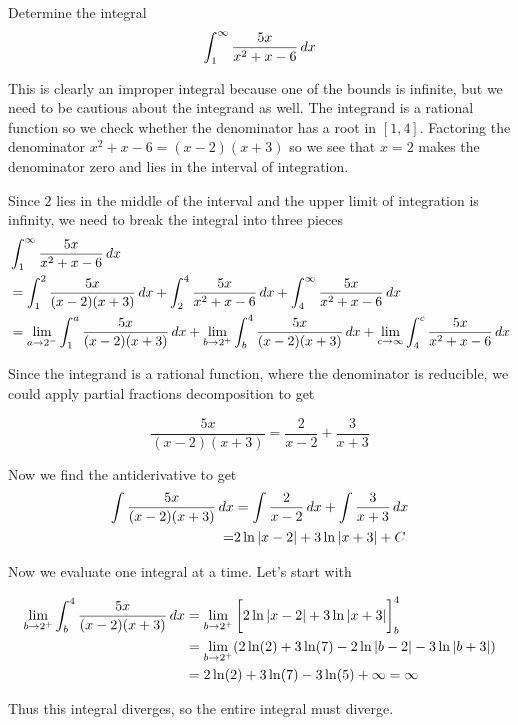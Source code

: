 \documentclass{ximera}
\begin{document}
\begin{example}
Determine the integral
\[
\int_{1}^{\infty} \frac{5x}{x^2+x-6} \mathop{}\!d x 
\]


\begin{explanation}
This is clearly an improper integral because one of the bounds is infinite, but we need to be cautious about the integrand as well. The integrand is a rational function so we check whether the denominator has a root in $[1,4]$. 
Factoring the denominator $x^2+x-6=(x-2)(x+3)$ so we see that $x=2$ makes the denominator zero 
and lies in the interval of integration. 

Since $2$ lies in the middle of the interval and the upper limit of integration is infinity, we need to break the integral into three pieces
\begin{align*}
& \int_{1}^{\infty} \frac{5x}{x^2+x-6} \mathop{}\!d x \\
&= \int_{1}^{2} \frac{5x}{(x-2)(x+3)} \mathop{}\!d x  + \int_{2}^{4} \frac{5x}{x^2+x-6} \mathop{}\!d x + \int_{4}^{\infty} \frac{5x}{x^2+x-6} \mathop{}\!d x\\
      &=\lim_{a \to 2^{-}} \int_{1}^a \frac{5x}{(x-2)(x+3)} \mathop{}\!d x + \lim_{b \to 2^{+}} \int_{b}^{4} \frac{5x}{(x-2)(x+3)} \mathop{}\!d x +\lim_{c \to \infty} \int_{4}^{c} \frac{5x}{x^2+x-6} \mathop{}\!d x
\end{align*}

Since the integrand is a rational function, where the denominator is reducible, we could apply partial fractions decomposition to get

\[
\frac{5x}{(x-2)(x+3)}=\frac{ 2}{x-2} +\frac{ 3}{x+3}
\]


Now we find the antiderivative to get 
\begin{align*}
\int \frac{5x}{(x-2)(x+3)} \mathop{}\!d x&=\int \frac{ 2}{x-2} \mathop{}\!d x + \int \frac{ 3}{x+3} \mathop{}\!d x \\
=& 2\ln|x-2| + 3\ln|x+3 | + C
\end{align*}


Now we evaluate one integral at a time.  Let's start with

\begin{align*}
\lim_{b \to 2^{+}} \int_{b}^{4} \frac{5x}{(x-2)(x+3)} \mathop{}\!d x&= \lim_{b \to 2^{+}} \bigg[  2\ln|x-2| + 3\ln|x+3 |  \bigg]_{b}^{4} \\
&=\lim_{b \to 2^{+}} (2\ln(2) + 3 \ln(7) - 2\ln|b-2| -3\ln|b+3| ) \\
&=2\ln(2) +3\ln(7)-3\ln(5) + \infty=\infty
\end{align*}

Thus this integral diverges, so the entire integral must diverge. 

\end{explanation}
\end{example}
\end{document}
